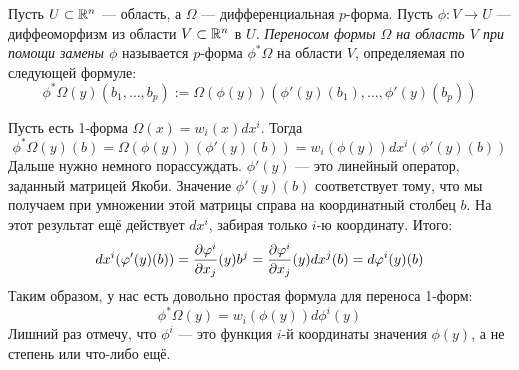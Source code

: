 \begin{definition}
	Пусть $U \subset \mathbb{R}^n$ --- область, а $\Omega$ --- дифференциальная $p$-форма. Пусть $\phi \colon V \to U$ --- диффеоморфизм из области $V \subset \mathbb{R}^n$ в $U$. \textit{Переносом формы $\Omega$ на область $V$ при помощи замены $\phi$} называется $p$-форма $\phi^*\Omega$ на области $V$, определяемая по следующей формуле:
	\[
		\phi^*\Omega(y)(b_1, \ldots, b_p) := \Omega(\phi(y))(\phi'(y)(b_1), \ldots, \phi'(y)(b_p))
	\]
\end{definition}

\begin{example}
	Пусть есть 1-форма $\Omega(x) = w_i(x)dx^i$. Тогда
	\[
		\phi^*\Omega(y)(b) = \Omega(\phi(y))(\phi'(y)(b)) = w_i(\phi(y)) dx^i(\phi'(y)(b))
	\]
	Дальше нужно немного порассуждать. $\phi'(y)$ --- это линейный оператор, заданный матрицей Якоби. Значение $\phi'(y)(b)$ соответствует тому, что мы получаем при умножении этой матрицы справа на координатный столбец $b$. На этот результат ещё действует $dx^i$, забирая только $i$-ю координату. Итого:
	\[
		dx^i(\varphi'(y)(b)) = \frac{\partial \varphi^i}{\partial x_j}(y) b^j = \frac{\partial \varphi^i}{\partial x_j}(y) dx^j(b) = d\varphi^i(y)(b)
	\]
	Таким образом, у нас есть довольно простая формула для переноса 1-форм:
	\[
		\phi^*\Omega(y) = w_i(\phi(y)) d\phi^i(y)
	\]
	Лишний раз отмечу, что $\phi^i$ --- это функция $i$-й координаты значения $\phi(y)$, а не степень или что-либо ещё.
\end{example}